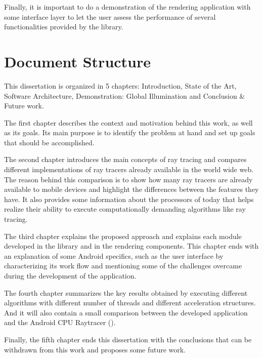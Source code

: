 \par
Finally, it is important to do a demonstration of the rendering application with some interface layer to let the user assess the performance of several functionalities provided by the library.

\section{Document Structure}

\par
This dissertation is organized in 5 chapters: Introduction, State of the Art, Software Architecture, Demonstration: Global Illumination and Conclusion \& Future work.

\par
The first chapter describes the context and motivation behind this work, as well as its goals.
Its main purpose is to identify the problem at hand and set up goals that should be accomplished.

\par
The second chapter introduces the main concepts of ray tracing and compares different implementations of ray tracers already available in the world wide web.
The reason behind this comparison is to show how many ray tracers are already available to mobile devices and highlight the differences between the features they have.
It also provides some information about the processors of today that helps realize their ability to execute computationally demanding algorithms like ray tracing.

\par
The third chapter explains the proposed approach and explains each module developed in the library and in the rendering components.
This chapter ends with an explanation of some Android specifics, such as the user interface by characterizing its work flow and mentioning some of the challenges overcame during the development of the application.

\par
The fourth chapter summarizes the key results obtained by executing different algorithms with different number of threads and different acceleration structures.
And it will also contain a small comparison between the developed application and the Android CPU Raytracer (\cite{Android_CPU_Raytracer}).

\par
Finally, the fifth chapter ends this dissertation with the conclusions that can be withdrawn from this work and proposes some future work.
